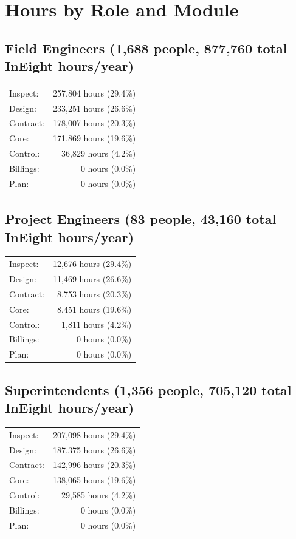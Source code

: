 \documentclass[11pt, letterpaper]{article}
\begin{document}
\newpage

\section*{Hours by Role and Module}

\subsection*{Field Engineers (1,688 people, 877,760 total InEight hours/year)}
\begin{center}
\footnotesize
\begin{tabular}{lr}
Inspect: & 257,804 hours (29.4\%) \\
Design: & 233,251 hours (26.6\%) \\
Contract: & 178,007 hours (20.3\%) \\
Core: & 171,869 hours (19.6\%) \\
Control: & 36,829 hours (4.2\%) \\
Billings: & 0 hours (0.0\%) \\
Plan: & 0 hours (0.0\%) \\
\end{tabular}
\end{center}

\subsection*{Project Engineers (83 people, 43,160 total InEight hours/year)}
\begin{center}
\footnotesize
\begin{tabular}{lr}
Inspect: & 12,676 hours (29.4\%) \\
Design: & 11,469 hours (26.6\%) \\
Contract: & 8,753 hours (20.3\%) \\
Core: & 8,451 hours (19.6\%) \\
Control: & 1,811 hours (4.2\%) \\
Billings: & 0 hours (0.0\%) \\
Plan: & 0 hours (0.0\%) \\
\end{tabular}
\end{center}

\subsection*{Superintendents (1,356 people, 705,120 total InEight hours/year)}
\begin{center}
\footnotesize
\begin{tabular}{lr}
Inspect: & 207,098 hours (29.4\%) \\
Design: & 187,375 hours (26.6\%) \\
Contract: & 142,996 hours (20.3\%) \\
Core: & 138,065 hours (19.6\%) \\
Control: & 29,585 hours (4.2\%) \\
Billings: & 0 hours (0.0\%) \\
Plan: & 0 hours (0.0\%) \\
\end{tabular}
\end{center}
\end{document}
